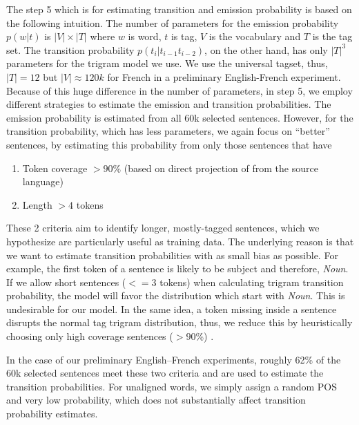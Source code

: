   
The step 5 which is for estimating transition and emission probability is based on the following intuition. The number of parameters for the emission probability $p(w|t)$ is $|V| \times |T|$ where $w$ is word, $t$ is tag, $V$ is the vocabulary and $T$ is the tag set. The transition probability $p(t_i|t_{i-1}t_{i-2})$, on the other hand, has only $|T|^3$ parameters
for the trigram model we use. We use the universal tagset, thus, $|T|= 12$ but $|V| \approx 120k$ for French in a preliminary English-French experiment. Because of this huge difference in the number of parameters, in step 5, we employ different strategies to estimate the emission and transition probabilities. The emission probability is estimated from all 60k selected sentences. However, for the transition probability, which has less parameters, we again focus on ``better''
sentences, by estimating this probability from only those sentences
that have 
\begin{enumerate}
\item Token coverage $>90\%$ (based on direct projection of
from the source language)
\item Length $>4$ tokens
\end{enumerate}
These 2 criteria aim to identify longer, mostly-tagged sentences, which we
hypothesize are particularly useful as training data. The underlying reason is that we want to estimate transition probabilities with as small bias as possible. For example, the first token of a sentence is likely to be subject and therefore, \textit{Noun}. If we allow short sentences ($<= 3$ tokens) when calculating trigram transition probability, the model will favor the distribution which start with \textit{Noun}. This is undesirable for our model. In the same idea, a token missing inside a sentence disrupts the normal tag trigram distribution, thus, we reduce this by heuristically choosing only high coverage sentences ($>90$\%) . 


In the case of our preliminary English--French experiments, roughly 62\% of the 60k selected sentences meet these two criteria and are used to estimate the transition probabilities. For unaligned words, we simply assign a random POS and very low probability, which does not substantially affect transition probability estimates. 

